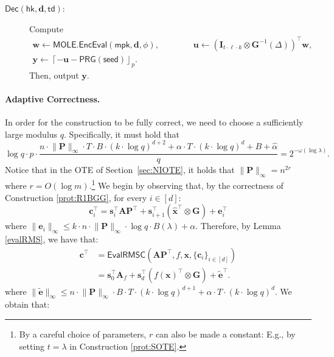 \documentclass{article}
\newcommand{\td}{\mathsf{td}}
\newcommand{\MOLE}{\mathsf{MOLE}}
\renewcommand{\sec}{\ensuremath{\lambda}}
\newcommand{\algofont}[1]{\ensuremath{\mathsf{#1}}}
\newcommand{\Enc}{{\algofont{Enc}}}
\newcommand{\Dec}{{\algofont{Dec}}}
\newcommand{\Eval}{\algofont{Eval}\xspace}
\newcommand{\id}{\ensuremath{\mathbf{I}}}
\newcommand{\mpk}{\mathsf{mpk}}
\newcommand{\hk}{\ensuremath{\mathsf{hk}}}
\newcommand{\secref}[1]{Section~\ref{sec:#1}}
\newenvironment{protocol}[1][]
{\begin{algorithm}\caption{#1}}
  {\end{algorithm}}
\begin{document}
\begin{protocol}[Input-Succinct Reverse TDH for RMS]
\begin{description}
\item[$\Dec(\hk, \mathbf{d}, \td)$:] Compute
\begin{gather*}
\mathbf{w}\gets \MOLE.\Enc\Eval(\mpk, \mathbf{d}, \phi), \qquad \qquad
\mathbf{u}\gets (\id_{t\cdot \ell\cdot k}\otimes \mathbf{G}^{-1}(\Delta))^\intercal \mathbf{w},\\
\mathbf{y}\gets \left\lceil -\mathbf{u}-\mathsf{PRG}(\mathsf{seed})\right\rfloor_p.
\end{gather*}
Then, output $\mathbf{y}$.
\end{description}
\end{protocol}

\paragraph{Adaptive Correctness.} In order for the construction to be fully correct, we need to choose a sufficiently large modulus $q$. Specifically, it must hold that 
\[\log q \cdot p\cdot \frac{n\cdot \lVert \mathbf{P}\rVert_\infty \cdot  T\cdot B \cdot (k\cdot \log q)^{d+2}+\alpha\cdot T\cdot (k\cdot \log q)^d+B+\hat{\alpha}}{q}=2^{-\omega(\log \sec)}.\] Notice that in the OTE of \secref{NIOTE}, it holds that $\lVert \mathbf{P}\rVert_\infty=n^{2r}$ where $r=O(\log m)$.\footnote{By a careful choice of parameters, $r$ can also be made a constant: E.g., by setting $t=\sec$ in Construction \ref{prot:SOTE}.}
We begin by observing that, by the correctness of Construction \ref{prot:R1BGG}, for every $i\in[d]$:
\[
\mathbf{c}_i^\intercal=\mathbf{s}_i^\intercal\mathbf{A}\mathbf{P}^\intercal+\mathbf{s}_{i+1}^\intercal(\hat{\mathbf{x}}^\intercal\otimes \mathbf{G})+\mathbf{e}_i^\intercal
\]
where $\lVert \mathbf{e}_i\rVert_\infty\le k\cdot n\cdot \lVert \mathbf{P}\rVert_\infty\cdot \log q \cdot B(\sec)+\alpha$.
Therefore, by Lemma \ref{evalRMS}, we have that:
\begin{align*}
\mathbf{c}^\intercal
&=\Eval\mathsf{RMSC}(\mathbf{A}\mathbf{P}^\intercal, f, \mathbf{x}, \{\mathbf{c}_i\}_{i\in[d]}) \\
&=\mathbf{s}_0^\intercal\mathbf{A}_f +\mathbf{s}_d^\intercal(f(\mathbf{x})^\intercal\otimes \mathbf{G})+\widetilde{\mathbf e}^\intercal.
\end{align*}
     where $\lVert \mathbf{\widetilde{e}}\rVert_\infty\le n\cdot \lVert \mathbf{P}\rVert_\infty\cdot B\cdot T\cdot (k\cdot \log q)^{d+1}+\alpha\cdot T\cdot (k\cdot \log q)^{d}$.
    We obtain that: 
\end{document}
